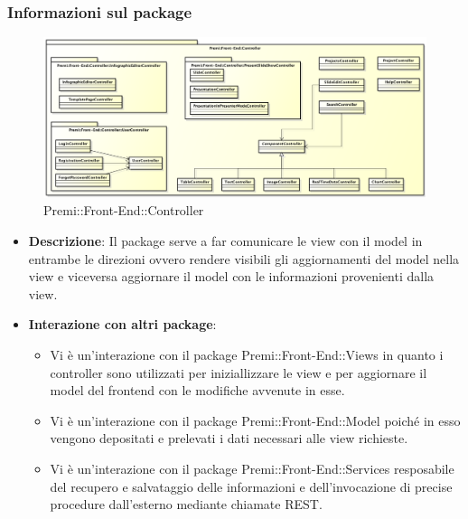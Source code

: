 \subsubsection{Informazioni sul package}
		\begin{figure}[h]
			\centering
			\includegraphics[width=1.0\linewidth]{img/front-end_controller}
			\caption[Premi::Front-End::Controller]{Premi::Front-End::Controller}
		\end{figure}
		\begin{itemize}
		 \item \textbf{Descrizione}: Il package serve a far comunicare le view con il model in entrambe le direzioni ovvero rendere visibili gli aggiornamenti del model nella view e viceversa aggiornare il model con le informazioni provenienti dalla view.
		 \item \textbf{Interazione con altri package}: 
		    \begin{itemize}
		     \item Vi è un'interazione con il package Premi::Front-End::Views in quanto i controller sono utilizzati per iniziallizzare le view e per aggiornare il model del frontend con le modifiche avvenute in esse.
		     \item Vi è un'interazione con il package Premi::Front-End::Model poiché in esso vengono depositati e prelevati i dati necessari alle view richieste.
		     \item Vi è un'interazione con il package Premi::Front-End::Services resposabile del recupero e salvataggio delle informazioni e dell'invocazione di precise procedure dall'esterno mediante chiamate REST.
		    \end{itemize}

		\end{itemize}

